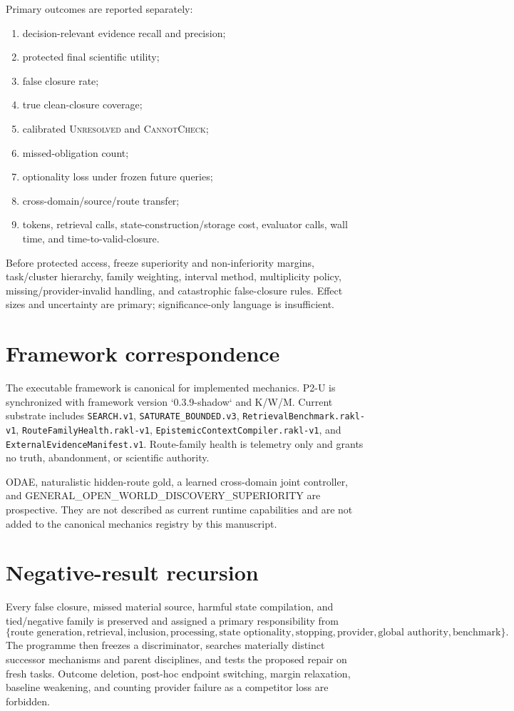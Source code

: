 \documentclass[11pt]{article}
\begin{document}
Primary outcomes are reported separately:
\begin{enumerate}
    \item decision-relevant evidence recall and precision;
    \item protected final scientific utility;
    \item false closure rate;
    \item true clean-closure coverage;
    \item calibrated \textsc{Unresolved} and \textsc{CannotCheck};
    \item missed-obligation count;
    \item optionality loss under frozen future queries;
    \item cross-domain/source/route transfer;
    \item tokens, retrieval calls, state-construction/storage cost, evaluator calls, wall time, and time-to-valid-closure.
\end{enumerate}
Before protected access, freeze superiority and non-inferiority margins, task/cluster hierarchy, family weighting, interval method, multiplicity policy, missing/provider-invalid handling, and catastrophic false-closure rules. Effect sizes and uncertainty are primary; significance-only language is insufficient.

\section{Framework correspondence}
The executable framework is canonical for implemented mechanics. P2-U is synchronized with framework version `0.3.9-shadow` and K/W/M. Current substrate includes \texttt{SEARCH.v1}, \texttt{SATURATE\_BOUNDED.v3}, \texttt{RetrievalBenchmark.rakl-v1}, \texttt{RouteFamilyHealth.rakl-v1}, \texttt{EpistemicContextCompiler.rakl-v1}, and \texttt{ExternalEvidenceManifest.v1}. Route-family health is telemetry only and grants no truth, abandonment, or scientific authority.

ODAE, naturalistic hidden-route gold, a learned cross-domain joint controller, and GENERAL\_OPEN\_WORLD\_DISCOVERY\_SUPERIORITY are prospective. They are not described as current runtime capabilities and are not added to the canonical mechanics registry by this manuscript.

\section{Negative-result recursion}
Every false closure, missed material source, harmful state compilation, and tied/negative family is preserved and assigned a primary responsibility from
\[
\{\text{route generation},\text{retrieval},\text{inclusion},\text{processing},\text{state optionality},\text{stopping},\text{provider},\text{global authority},\text{benchmark}\}.
\]
The programme then freezes a discriminator, searches materially distinct successor mechanisms and parent disciplines, and tests the proposed repair on fresh tasks. Outcome deletion, post-hoc endpoint switching, margin relaxation, baseline weakening, and counting provider failure as a competitor loss are forbidden.
\end{document}
